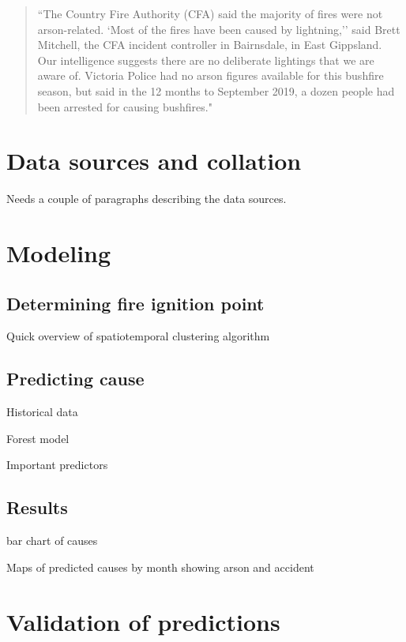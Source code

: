 \documentclass[
  11pt,
  a4paper,
]{article}
\begin{document}
\begin{quote}
``The Country Fire Authority (CFA) said the majority of fires were not arson-related. `Most of the fires have been caused by lightning,'' said Brett Mitchell, the CFA incident controller in Bairnsdale, in East Gippsland. Our intelligence suggests there are no deliberate lightings that we are aware of. Victoria Police had no arson figures available for this bushfire season, but said in the 12 months to September 2019, a dozen people had been arrested for causing bushfires."
\end{quote}

\hypertarget{data}{%
\section{Data sources and collation}\label{data}}

Needs a couple of paragraphs describing the data sources.

\hypertarget{models}{%
\section{Modeling}\label{models}}

\hypertarget{ignition}{%
\subsection{Determining fire ignition point}\label{ignition}}

Quick overview of spatiotemporal clustering algorithm

\hypertarget{predicting-cause}{%
\subsection*{Predicting cause}\label{predicting-cause}}

Historical data

Forest model

Important predictors

\hypertarget{results}{%
\subsection{Results}\label{results}}

bar chart of causes

Maps of predicted causes by month showing arson and accident

\hypertarget{validation-of-predictions}{%
\section*{Validation of predictions}\label{validation-of-predictions}}
\end{document}
